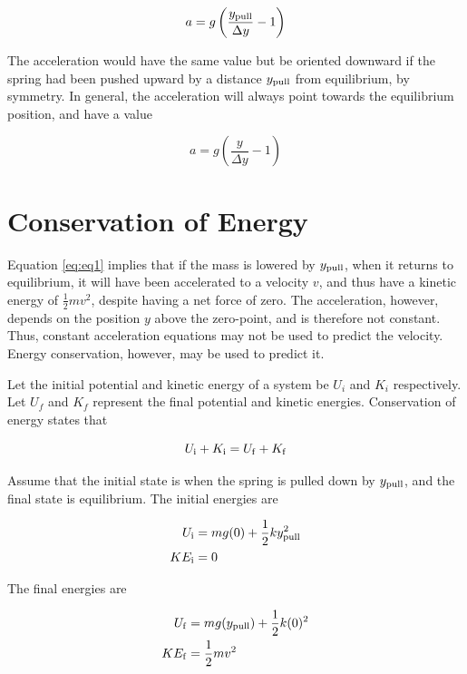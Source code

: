 \documentclass{article}
\begin{document}
\begin{equation}
a = g\left(\frac{y_{\rm pull}}{\Delta y} - 1\right)
\end{equation}

The acceleration would have the same value but be oriented downward if the spring had been pushed upward by a distance $y_{\rm pull}$ from equilibrium, by symmetry.  In general, the acceleration will always point towards the equilibrium position, and have a value

\begin{equation}
a = g\left(\frac{y}{\Delta y} - 1\right) \label{eq:eq1}
\end{equation}

\section{Conservation of Energy}

Equation \ref{eq:eq1} implies that if the mass is lowered by $y_{\rm pull}$, when it returns to equilibrium, it will have been accelerated to a velocity $v$, and thus have a kinetic energy of $\frac{1}{2}mv^2$, despite having a net force of zero.  The acceleration, however, depends on the position $y$ above the zero-point, and is therefore not constant.  Thus, constant acceleration equations may not be used to predict the velocity.  Energy conservation, however, may be used to predict it.

Let the initial potential and kinetic energy of a system be $U_i$ and $K_i$ respectively.  Let $U_f$ and $K_f$ represent the final potential and kinetic energies.  Conservation of energy states that

\begin{equation}
U_{\rm i} + K_{\rm i} = U_{\rm f} + K_{\rm f} \label{eq:encon}
\end{equation}

Assume that the initial state is when the spring is pulled down by $y_{\rm pull}$, and the final state is equilibrium.  The initial energies are

\begin{align}
U_{\rm i} &= m g (0) + \frac{1}{2}ky_{\rm pull}^2 \\
KE_{\rm i} &= 0
\end{align}

The final energies are

\begin{align}
U_{\rm f} &= m g (y_{\rm pull}) + \frac{1}{2}k(0)^2 \\
KE_{\rm f} &= \frac{1}{2}mv^2
\end{align}
\end{document}

